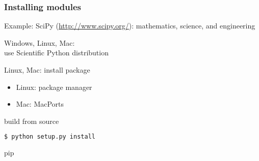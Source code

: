 \begin{frame}[fragile]
\frametitle{Installing modules}

Example: SciPy (\url{http://www.scipy.org/}): mathematics, science, and engineering

\begin{description}
\item<1->[Easy way:] Windows, Linux, Mac:\\
use Scientific Python distribution 
\item<2->[Intermediate:] Linux, Mac: install package\\
\begin{itemize}
\item Linux: package manager
\item Mac: MacPorts
\end{itemize}
\item<3->[Harder:] build from source
\begin{lstlisting}[language=bash]
 $ python setup.py install
\end{lstlisting}
\item<4->[Better:] pip
\end{description}

\end{frame}


